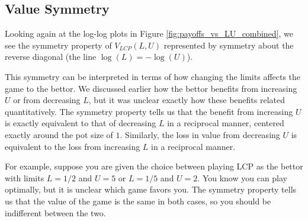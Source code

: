 \documentclass[../../main/main.tex]{subfiles}
\begin{document}
\subsection{Value Symmetry}

Looking again at the log-log plots in Figure \ref{fig:payoffs_vs_LU_combined}, we see the symmetry property of $V_{LCP}(L, U)$ represented by symmetry about the reverse diagonal (the line $\log(L) = -\log(U)$). 

This symmetry can be interpreted in terms of how changing the limits affects the game to the bettor. We discussed earlier how the bettor benefits from increasing $U$ or from decreasing $L$, but it was unclear exactly how these benefits related quantitatively. The symmetry property tells us that the benefit from increasing $U$ is exactly equivalent to that of decreasing $L$ in a reciprocal manner, centered exactly around the pot size of $1$. Similarly, the loss in value from decreasing $U$ is equivalent to the loss from increasing $L$ in a reciprocal manner.

For example, suppose you are given the choice between playing LCP as the bettor with limits $L=1/2$ and $U=5$ or $L=1/5$ and $U=2$. You know you can play optimally, but it is unclear which game favors you. The symmetry property tells us that the value of the game is the same in both cases, so you should be indifferent between the two.
\end{document}

